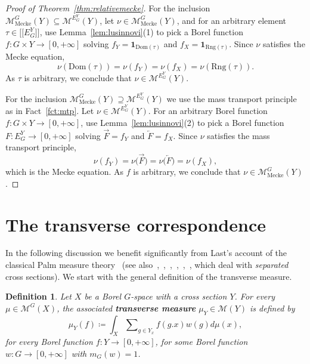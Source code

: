 \documentclass{amsart}
\numberwithin{equation}{subsection}
\newtheorem{defn}[thm]{Definition}
\theoremstyle{remark}
\begin{document}
\begin{proof}[Proof of Theorem~\ref{thm:relativemecke}]
For the inclusion \(\mathcal{M}_{\mathrm{Mecke}}^{G}\left(Y\right)\subseteq\mathcal{M}^{E_{G}^{Y}}\left(Y\right)\), let \(\nu\in\mathcal{M}_{\mathrm{Mecke}}^{G}\left(Y\right)\), and for an arbitrary element \(\tau\in\bigl[\!\bigl[E_{G}^{Y}\bigr]\!\bigr]\), use Lemma~\ref{lem:lusinnovi}(1) to pick a Borel function \(f:G\times Y\to\left[0,+\infty\right]\) solving \(f_{Y}=\mathbf{1}_{\mathrm{Dom}\left(\tau\right)}\) and \(f_{X}=\mathbf{1}_{\mathrm{Rng}\left(\tau\right)}\). Since \(\nu\) satisfies the Mecke equation,
\[\nu\left(\mathrm{Dom}\left(\tau\right)\right)=\nu\left(f_{Y}\right)=\nu\left(f_{X}\right)=\nu\left(\mathrm{Rng}\left(\tau\right)\right).\]
As \(\tau\) is arbitrary, we conclude that \(\nu\in\mathcal{M}^{E_{G}^{Y}}\left(Y\right)\).

For the inclusion \(\mathcal{M}_{\mathrm{Mecke}}^{G}\left(Y\right)\supseteq\mathcal{M}^{E_{G}^{Y}}\left(Y\right)\) we use the mass transport principle as in Fact~\ref{fct:mtp}. Let \(\nu\in\mathcal{M}^{E_{G}^{Y}}\left(Y\right)\). For an arbitrary Borel function \(f:G\times Y\to\left[0,+\infty\right]\), use Lemma~\ref{lem:lusinnovi}(2) to pick a Borel function \(F:E_{G}^{Y}\to\left[0,+\infty\right]\) solving \(\overrightarrow{F}=f_{Y}\) and \(\overleftarrow{F}=f_{X}\). Since \(\nu\) satisfies the mass transport principle,
\[\nu\left(f_{Y}\right)=\nu\big(\overrightarrow{F}\big)=\nu\big(\overleftarrow{F}\big)=\nu\left(f_{X}\right),\]
which is the Mecke equation. As \(f\) is arbitrary, we conclude that \(\nu\in\mathcal{M}_{\mathrm{Mecke}}^{G}\left(Y\right)\).
\end{proof}

\section{The transverse correspondence}\label{sct:transverse}

In the following discussion we benefit significantly from Last's account of the classical Palm measure theory~\cite{last2009} (see also~\cite{connes1979},~\cite[Appendix A.1]{anantharaman2000},~\cite[\S2]{avni2010entropy},~\cite[Appendix B]{kyed2015},~\cite[\S4]{Slutsky2017},~\cite[\S1.5]{bjorklund2025int}, which deal with \emph{separated} cross sections). We start with the general definition of the transverse measure.

\begin{defn}\label{dfn:transdef}
Let \(X\) be a Borel \(G\)-space with a cross section \(Y\). For every \(\mu\in\mathcal{M}^{G}\left(X\right)\), the associated {\bf transverse measure} \(\mu_{Y}\in\mathcal{M}\left(Y\right)\) is defined by
\[\mu_{Y}\left(f\right)\coloneqq\int_{X}\sum\nolimits_{g\in Y_{x}}f\left(g.x\right)w\left(g\right)d\mu\left(x\right),\]
for every Borel function \(f:Y\to\left[0,+\infty\right]\), for some Borel function \(w:G\to\left[0,+\infty\right]\) with \(m_{G}\left(w\right)=1\).
\end{defn}
\end{document}
